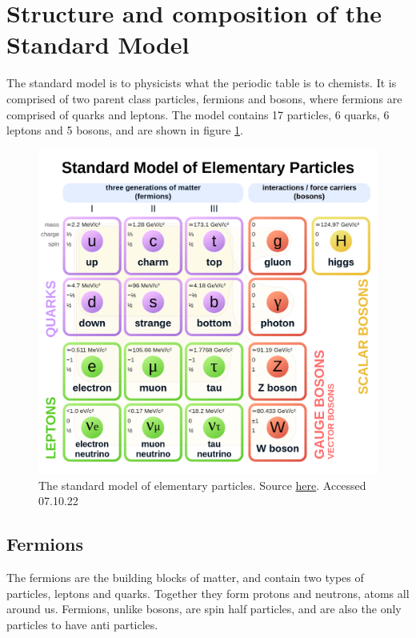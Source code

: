 \section*{Structure and composition of the Standard Model}
The standard model is to physicists what the periodic table is to chemists. It is comprised of two parent class particles, fermions and bosons, where fermions 
are comprised of quarks and leptons. The model contains 17 particles, 6 quarks, 6 leptons and 5 bosons, and are shown in figure \ref{fig:smdiagram}.

\begin{figure}
    \includegraphics[width=\linewidth]{Figures/SM/Standard_Model_of_Elementary_Particles.svg.png}
    \caption{The standard model of elementary particles. Source \href{https://upload.wikimedia.org/wikipedia/commons/thumb/0/00/Standard_Model_of_Elementary_Particles.svg/1200px-Standard_Model_of_Elementary_Particles.svg.png}{here}. Accessed 07.10.22}
    \label{fig:smdiagram}
\end{figure}


\subsection*{Fermions}
The fermions are the building blocks of matter, and contain two types of particles, leptons and quarks. Together they form protons and neutrons,  atoms all around us.
Fermions, unlike bosons, are spin half particles, and are also the only particles to have anti particles. 


